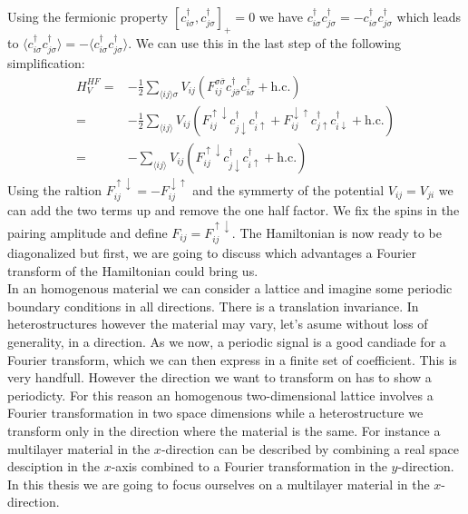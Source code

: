 \documentclass[../main.tex]{subfile}
\begin{document}
Using the fermionic property $[c_{i\sigma}^{\dagger},c_{j\sigma}^{\dagger}]_+ = 0$ we have $c_{i\sigma}^{\dagger} c_{j\sigma}^{\dagger} = -c_{i\sigma}^{\dagger} c_{j\sigma}^{\dagger}$
which leads to $\langle  c_{i\sigma}^{\dagger} c_{j\sigma}^{\dagger} \rangle = -\langle c_{i\sigma}^{\dagger} c_{j\sigma}^{\dagger}\rangle$. We can use this in the last step of the following simplification:
\begin{equation}\label{eq:HF_V}
    \begin{aligned}
        H^{HF}_V =& -\frac{1}{2} \sum_{\langle ij\rangle \sigma} V_{ij} \left(F_{ij}^{\sigma \bar{\sigma}} c^{\dagger}_{j\bar{\sigma}}c^{\dagger}_{i\sigma} + \text{h.c.}\right)\\
            =& -\frac{1}{2}\sum_{\langle ij\rangle} V_{ij} \left(F_{ij}^{\uparrow \downarrow} c^{\dagger}_{j\downarrow}c^{\dagger}_{i\uparrow} + F_{ij}^{\downarrow\uparrow} c^{\dagger}_{j\uparrow}c^{\dagger}_{i\downarrow} + \text{h.c.}\right)\\
            =& -\sum_{\langle ij\rangle} V_{ij} \left(F_{ij}^{\uparrow \downarrow} c^{\dagger}_{j\downarrow}c^{\dagger}_{i\uparrow} + \text{h.c.}\right)
    \end{aligned}
\end{equation}
Using the raltion $F_{ij}^{\uparrow\downarrow} = -F_{ij}^{\downarrow\uparrow}$ and the symmerty of the potential $V_{ij} = V_{ji}$ we can add the two terms up and remove the one half factor.
We fix the spins in the pairing amplitude and define $F_{ij} = F_{ij}^{\uparrow\downarrow}$.
The Hamiltonian is now ready to be diagonalized but first, we are going to discuss which advantages a Fourier transform of the Hamiltonian could bring us.\\
 
In an homogenous material we can consider a lattice and imagine some periodic boundary conditions in all directions. There is a translation invariance.
In heterostructures however the material may vary, let's asume
without loss of generality, in a direction. As we now, a periodic signal is a good candiade for a Fourier transform, which we can then express in a finite set of coefficient. This is very handfull.
However the direction we want to transform on has to show a periodicty. For this reason an homogenous two-dimensional lattice involves a Fourier transformation in two space dimensions while a heterostructure
we transform only in the direction where the material is the same. For instance a multilayer material in the $x$-direction can be described by combining a real space desciption in the $x$-axis 
combined to a Fourier transformation in the $y$-direction.
In this thesis we are going to focus ourselves on a multilayer material in the $x$-direction.\\
\end{document}
